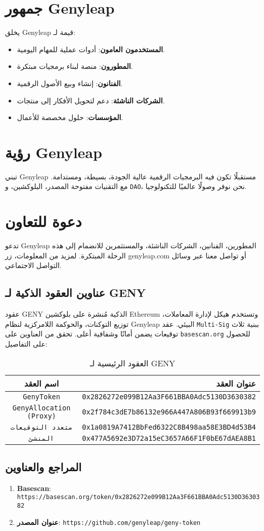 \documentclass[a4paper,12pt,openany]{book}
\begin{document}
\chapter{جمهور Genyleap}
يخلق Genyleap قيمة لـ:
\begin{itemize}
    \item \textbf{المستخدمون العامون}: أدوات عملية للمهام اليومية.
    \item \textbf{المطورون}: منصة لبناء برمجيات مبتكرة.
    \item \textbf{الفنانون}: إنشاء وبيع الأصول الرقمية.
    \item \textbf{الشركات الناشئة}: دعم لتحويل الأفكار إلى منتجات.
    \item \textbf{المؤسسات}: حلول مخصصة للأعمال.
\end{itemize}

\chapter{رؤية Genyleap}
تبني Genyleap مستقبلًا تكون فيه البرمجيات الرقمية عالية الجودة، بسيطة، ومستدامة. مع التقنيات مفتوحة المصدر، البلوكشين، و \texttt{DAO}، نحن نوفر وصولًا عالميًا للتكنولوجيا.

\chapter{دعوة للتعاون}
تدعو Genyleap المطورين، الفنانين، الشركات الناشئة، والمستثمرين للانضمام إلى هذه الرحلة المبتكرة. لمزيد من المعلومات، زر genyleap.com أو تواصل معنا عبر وسائل التواصل الاجتماعي.

\section*{عناوين العقود الذكية لـ GENY}
عقود GENY الذكية مُنشرة على بلوكشين Ethereum وتستخدم هيكل  لإدارة المعاملات، توزيع التوكنات، والحوكمة اللامركزية لنظام Genyleap البيئي. عقد \texttt{Multi-Sig} ببنية ثلاث توقيعات يضمن أمانًا وشفافية أعلى. تحقق من العناوين على \texttt{basescan.org} للحصول على التفاصيل:

\begin{table}[h]
\centering
\caption*{العقود الرئيسية لـ GENY}
\small
\begin{tabular}{c r}
\hline
\textbf{اسم العقد} & \textbf{عنوان العقد} \\
\hline
\texttt{GenyToken} & {\texttt{0x2826272e099B12Aa3F661BBA0Adc5130D3630382}} \\
\texttt{GenyAllocation (Proxy)} & {\texttt{0x2f784c3dE7b86132e966A447A806B93f669913b9}} \\
\texttt{متعدد التوقيعات} & {\texttt{0x1a0819A7412BbFed6322C8B498aa58E3BD4d53B4}} \\
\texttt{المنشئ} & {\texttt{0x477A5692e3D72a15eC3657A66F1F0bE67dAEA8B1}} \\
\hline
\end{tabular}
\end{table}

\section*{المراجع والعناوين}

\begin{enumerate}
    \item \textbf{Basescan}: \texttt{https://basescan.org/token/0x2826272e099B12Aa3F661BBA0Adc5130D3630382}
    \item \textbf{عنوان المصدر}: \texttt{https://github.com/genyleap/geny-token}
\end{enumerate}
\end{document}
